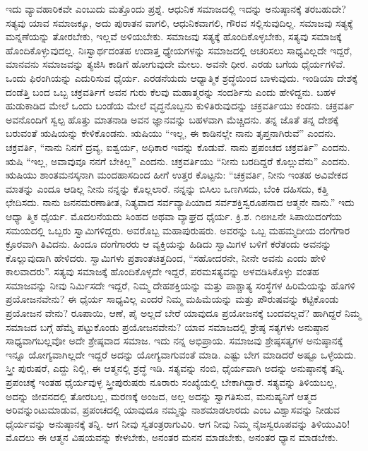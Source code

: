 ಇದು ವ್ಯಾವಹಾರಿಕವೇ ಎಂಬುದು ಮತ್ತೊಂದು ಪ್ರಶ್ನೆ. ಆಧುನಿಕ ಸಮಾಜದಲ್ಲಿ ಇದನ್ನು ಅನುಷ್ಠಾನಕ್ಕೆ ತರಬಹುದೇ? ಸತ್ಯವು ಯಾವ ಸಮಾಜಕ್ಕೂ, ಅದು ಪುರಾತನ ವಾಗಲಿ, ಆಧುನಿಕವಾಗಲಿ, ಗೌರವ ಸಲ್ಲಿಸುವುದಿಲ್ಲ. ಸಮಾಜವು ಸತ್ಯಕ್ಕೆ ಮನ್ನಣೆಯನ್ನು ತೋರಬೇಕು, ಇಲ್ಲವೆ ಅಳಿಯಬೇಕು. ಸಮಾಜವು ಸತ್ಯಕ್ಕೆ ಹೊಂದಿಕೊಳ್ಳಬೇಕು, ಸತ್ಯವು ಸಮಾಜಕ್ಕೆ ಹೊಂದಿಕೊಳ್ಳುವುದಲ್ಲ. ನಿಃಸ್ವಾರ್ಥದಂತಹ ಉದಾತ್ತ ಧ್ಯೇಯಗಳನ್ನು ಸಮಾಜದಲ್ಲಿ ಆಚರಿಸಲು ಸಾಧ್ಯವಿಲ್ಲದೇ ಇದ್ದರೆ, ಮಾನವನು ಸಮಾಜವನ್ನು ತ್ಯಜಿಸಿ ಕಾಡಿಗೆ ಹೋಗುವುದೇ ಮೇಲು. ಅವನೇ ಧೀರ. ಎರಡು ಬಗೆಯ ಧೈರ್ಯಗಳಿವೆ. ಒಂದು ಫಿರಂಗಿಯನ್ನು ಎದುರಿಸುವ ಧೈರ್ಯ. ಎರಡನೆಯದು ಆಧ್ಯಾತ್ಮಿಕ ಶ್ರದ್ಧೆಯಿಂದ ಬಾಳುವುದು. ಇಂಡಿಯಾ ದೇಶಕ್ಕೆ ದಂಡೆತ್ತಿ ಬಂದ ಒಬ್ಬ ಚಕ್ರವರ್ತಿಗೆ ಅವನ ಗುರು ಕೆಲವು ಮಹಾತ್ಮರನ್ನು ಸಂದರ್ಶಿಸು ಎಂದು ಹೇಳಿದ್ದನು. ಬಹಳ ಹುಡುಕಾಡಿದ ಮೇಲೆ ಒಂದು ಬಂಡೆಯ ಮೇಲೆ ವೃದ್ಧನೊಬ್ಬನು ಕುಳಿತಿರುವುದನ್ನು ಚಕ್ರವರ್ತಿಯು ಕಂಡನು. ಚಕ್ರವರ್ತಿ ಅವನೊಂದಿಗೆ ಸ್ವಲ್ಪ ಹೊತ್ತು ಮಾತನಾಡಿ ಅವನ ಜ್ಞಾನವನ್ನು ಬಹಳವಾಗಿ ಮೆಚ್ಚಿದನು. ತನ್ನ ಜೊತೆ ತನ್ನ ದೇಶಕ್ಕೆ ಬರುವಂತೆ ಋಷಿಯನ್ನು ಕೇಳಿಕೊಂಡನು. ಋಷಿಯು “ಇಲ್ಲ, ಈ ಕಾಡಿನಲ್ಲೇ ನಾನು ತೃಪ್ತನಾಗಿರುವೆ” ಎಂದನು. ಚಕ್ರವರ್ತಿ, “ನಾನು ನಿನಗೆ ದ್ರವ್ಯ, ಐಶ್ವರ್ಯ, ಅಧಿಕಾರ ಇವನ್ನು ಕೊಡುವೆ. ನಾನು ಪ್ರಪಂಚದ ಚಕ್ರವರ್ತಿ” ಎಂದನು. ಋಷಿ “ಇಲ್ಲ, ಅವಾವುವೂ ನನಗೆ ಬೇಕಿಲ್ಲ” ಎಂದನು. ಚಕ್ರವರ್ತಿಯು “ನೀನು ಬರದಿದ್ದರೆ ಕೊಲ್ಲುವೆನು” ಎಂದನು. ಋಷಿಯು ಶಾಂತಮನಸ್ಕನಾಗಿ ಮಂದಹಾಸದಿಂದ ಹೀಗೆ ಉತ್ತರ ಕೊಟ್ಟನು: “ಚಕ್ರವರ್ತಿ, ನೀನು ಇಂತಹ ಅವಿವೇಕದ ಮಾತನ್ನು ಎಂದೂ ಆಡಿಲ್ಲ ನೀನು ನನ್ನನ್ನು ಕೊಲ್ಲಲಾರೆ. ನನ್ನನ್ನು ಬಿಸಿಲು ಒಣಗಿಸದು, ಬೆಂಕಿ ದಹಿಸದು, ಕತ್ತಿ ಛೇದಿಸದು. ನಾನು ಜನನಮರಣಾತೀತ, ನಿತ್ಯವಾದ ಸರ್ವವ್ಯಾಪಿಯಾದ ಸರ್ವಶಕ್ತಿಸ್ವರೂಪನಾದ ಆತ್ಮನೇ ನಾನು.” ಇದು ಆಧ್ಯಾ ತ್ಮಿಕ ಧೈರ್ಯ. ಮೊದಲನೆಯದು ಸಿಂಹದ ಅಥವಾ ವ್ಯಾಘ್ರದ ಧೈರ್ಯ. ಕ್ರಿ.ಶ. ೧೮೫೭ನೇ ಸಿಪಾಯಿದಂಗೆಯ ಸಮಯದಲ್ಲಿ ಒಬ್ಬರು ಸ್ವಾಮಿಗಳಿದ್ದರು. ಅವರೊಬ್ಬ ಮಹಾಪುರುಷರು. ಅವರನ್ನು ಒಬ್ಬ ಮಹಮ್ಮದೀಯ ದಂಗೆಗಾರ ಕ್ರೂರವಾಗಿ ತಿವಿದನು. ಹಿಂದೂ ದಂಗೆಗಾರರು ಆ ವ್ಯಕ್ತಿಯನ್ನು ಹಿಡಿದು ಸ್ವಾಮಿಗಳ ಬಳಿಗೆ ಕರೆತಂದು ಅವನನ್ನು ಕೊಲ್ಲುವುದಾಗಿ ಹೇಳಿದರು. ಸ್ವಾಮಿಗಳು ಪ್ರಶಾಂತಚಿತ್ತದಿಂದ, “ಸಹೋದರನೇ, ನೀನೇ ಅವನು ಎಂದು ಹೇಳಿ ಕಾಲವಾದರು”. ಸತ್ಯವು ಸಮಾಜಕ್ಕೆ ಹೊಂದಿಕೊಳ್ಳದೇ ಇದ್ದರೆ, ಪರಮಸತ್ಯವನ್ನು ಅಳವಡಿಸಿಕೊಳ್ಳು ವಂತಹ ಸಮಾಜವನ್ನು ನೀವು ನಿರ್ಮಿಸದೇ ಇದ್ದರೆ, ನಿಮ್ಮ ದೇಹಶಕ್ತಿಯನ್ನು ಮತ್ತು ಪಾಶ್ಚಾತ್ಯ ಸಂಸ್ಥೆಗಳ ಹಿರಿಮೆಯನ್ನು ಹೊಗಳಿ ಪ್ರಯೋಜನವೇನು? ಈ ಧೈರ್ಯ ಸಾಧ್ಯವಿಲ್ಲ ಎಂದರೆ ನಿಮ್ಮ ಮಹಿಮೆಯನ್ನು ಮತ್ತು ಪೌರುಷವನ್ನು ಕಟ್ಟಿಕೊಂಡು ಪ್ರಯೋಜನ ವೇನು? ರೂಪಾಯಿ, ಆಣೆ, ಪೈ ಅಲ್ಲದೆ ಬೇರೆ ಯಾವುದೂ ಪ್ರಯೋಜನಕ್ಕೆ ಬಂದವಲ್ಲವೆ? ಹಾಗಿದ್ದರೆ ನಿಮ್ಮ ಸಮಾಜದ ಬಗ್ಗೆ ಹೆಮ್ಮೆ ಪಟ್ಟುಕೊಂಡು ಪ್ರಯೋಜನವೇನು? ಯಾವ ಸಮಾಜದಲ್ಲಿ ಶ್ರೇಷ್ಠ ಸತ್ಯಗಳು ಅನುಷ್ಠಾನ ಸಾಧ್ಯವಾಗಬಲ್ಲವೋ ಅದೇ ಶ್ರೇಷ್ಠವಾದ ಸಮಾಜ. ಇದು ನನ್ನ ಅಭಿಪ್ರಾಯ. ಸಮಾಜವು ಶ್ರೇಷ್ಠಸತ್ಯಗಳ ಅನುಷ್ಠಾನಕ್ಕೆ ಇನ್ನೂ ಯೋಗ್ಯವಾಗಿಲ್ಲದೇ ಇದ್ದರೆ ಅದನ್ನು ಯೋಗ್ಯವಾಗುವಂತೆ ಮಾಡಿ. ಎಷ್ಟು ಬೇಗ ಮಾಡಿದರೆ ಅಷ್ಟೂ ಒಳ್ಳೆಯದು. ಸ್ತ್ರೀ ಪುರುಷರೆ, ಎದ್ದು ನಿಲ್ಲಿ, ಈ ಆತ್ಮನಲ್ಲಿ ಶ್ರದ್ಧೆ ಇಡಿ. ಸತ್ಯವನ್ನು ನಂಬಿ, ಧೈರ್ಯವಾಗಿ ಅದನ್ನು ಅನುಷ್ಠಾನಕ್ಕೆ ತನ್ನಿ. ಪ್ರಪಂಚಕ್ಕೆ ಇಂತಹ ಧೈರ್ಯವುಳ್ಳ ಸ್ತ್ರೀಪುರುಷರು ನೂರಾರು ಸಂಖ್ಯೆಯಲ್ಲಿ ಬೇಕಾಗಿದ್ದಾರೆ. ಸತ್ಯವನ್ನು ತಿಳಿಯಬಲ್ಲ, ಅದನ್ನು ಜೀವನದಲ್ಲಿ ತೋರಬಲ್ಲ, ಮರಣಕ್ಕೆ ಅಂಜದ, ಅಲ್ಲ ಅದನ್ನು ಸ್ವಾಗತಿಸುವ, ಮನುಷ್ಯನಿಗೆ ಆತ್ಮದ ಅರಿವನ್ನುಂಟುಮಾಡುವ, ಪ್ರಪಂಚದಲ್ಲಿ ಯಾವುದೂ ನಮ್ಮನ್ನು ನಾಶಮಾಡಲಾರದು ಎಂಬ ವಿಶ್ವಾಸವನ್ನು ನೀಡುವ ಧೈರ್ಯವನ್ನು ಅನುಷ್ಠಾನಕ್ಕೆ ತನ್ನಿ. ಆಗ ನೀವು ಸ್ವತಂತ್ರರಾಗುವಿರಿ. ಆಗ ನೀವು ನಿಮ್ಮ ನೈಜಸ್ವರೂಪವನ್ನು ತಿಳಿಯುವಿರಿ! ಮೊದಲು ಈ ಆತ್ಮನ ವಿಷಯವನ್ನು ಕೇಳಬೇಕು, ಅನಂತರ ಮನನ ಮಾಡಬೇಕು, ಅನಂತರ ಧ್ಯಾನ ಮಾಡಬೇಕು.

